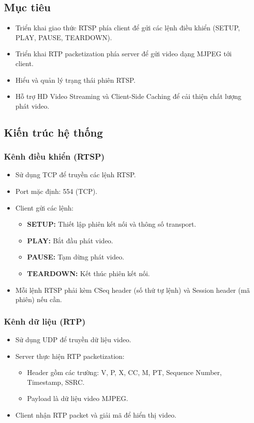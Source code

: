 \documentclass[a4paper,12pt]{article}
\begin{document}
\subsection{Mục tiêu}
\begin{itemize}
    \item Triển khai giao thức RTSP phía client để gửi các lệnh điều khiển (SETUP, PLAY, PAUSE, TEARDOWN).
    \item Triển khai RTP packetization phía server để gửi video dạng MJPEG tới client.
    \item Hiểu và quản lý trạng thái phiên RTSP.
    \item Hỗ trợ HD Video Streaming và Client-Side Caching để cải thiện chất lượng phát video.
\end{itemize}

\subsection{Kiến trúc hệ thống}

\subsubsection{Kênh điều khiển (RTSP)}
\begin{itemize}
    \item Sử dụng TCP để truyền các lệnh RTSP.
    \item Port mặc định: 554 (TCP).
    \item Client gửi các lệnh:
    \begin{itemize}
        \item \textbf{SETUP:} Thiết lập phiên kết nối và thông số transport.
        \item \textbf{PLAY:} Bắt đầu phát video.
        \item \textbf{PAUSE:} Tạm dừng phát video.
        \item \textbf{TEARDOWN:} Kết thúc phiên kết nối.
    \end{itemize}
    \item Mỗi lệnh RTSP phải kèm CSeq header (số thứ tự lệnh) và Session header (mã phiên) nếu cần.
\end{itemize}

\subsubsection{Kênh dữ liệu (RTP)}
\begin{itemize}
    \item Sử dụng UDP để truyền dữ liệu video.
    \item Server thực hiện RTP packetization:
    \begin{itemize}
        \item Header gồm các trường: V, P, X, CC, M, PT, Sequence Number, Timestamp, SSRC.
        \item Payload là dữ liệu video MJPEG.
    \end{itemize}
    \item Client nhận RTP packet và giải mã để hiển thị video.
\end{itemize}
\end{document}
